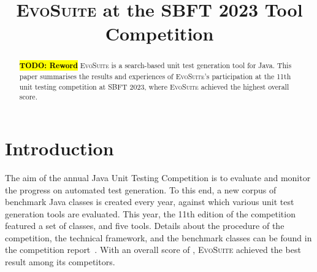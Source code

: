 \documentclass[10pt,conference]{IEEEtran}
\newcommand{\TODO}[1]{\sethlcolor{yellow}\textbf{\textcolor{ScarletRed}{\hl{TODO: #1}}}\xspace}
\newcommand{\TODO}[1]{}
\newcommand{\EVOSUITE}{\textsc{EvoSuite}\xspace}
\begin{document}
%

\title{\EVOSUITE at the SBFT 2023 Tool Competition}


\author{%
  \and
  \and
}

\maketitle

\begin{abstract}
  \TODO{Reword}
  \EVOSUITE is a search-based unit test generation tool for Java. This paper summarises the results and experiences of \EVOSUITE's participation at the 11th unit testing competition at SBFT 2023, where \EVOSUITE achieved the highest overall score.
\end{abstract}


\section{Introduction}
%
The aim of the annual Java Unit Testing Competition is to evaluate and monitor
the progress on automated test generation. To this end, a new corpus of benchmark
Java classes is created every year, against which various unit test generation tools
are evaluated. This year, the 11th edition of the competition featured a set of \cuts
classes, and five tools. Details about the procedure of the competition, the
technical framework, and the benchmark classes can be found in the competition
report~\cite{SBFT-toolcomp23}. With an overall score of \score, \EVOSUITE achieved the
best result among its competitors.
\end{document}
